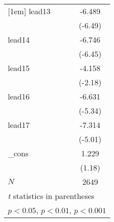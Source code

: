 {\begin{tabular}{l*{1}{c}}
[1em]
lead13      &      -6.489\sym{***}\\
            &     (-6.49)         \\
[1em]
lead14      &      -6.746\sym{***}\\
            &     (-6.45)         \\
[1em]
lead15      &      -4.158\sym{*}  \\
            &     (-2.18)         \\
[1em]
lead16      &      -6.631\sym{***}\\
            &     (-5.34)         \\
[1em]
lead17      &      -7.314\sym{***}\\
            &     (-5.01)         \\
[1em]
\_cons      &       1.229         \\
            &      (1.18)         \\
\hline
\(N\)       &        2649         \\
\hline\hline
\multicolumn{2}{l}{\footnotesize \textit{t} statistics in parentheses}\\
\multicolumn{2}{l}{\footnotesize \sym{*} \(p<0.05\), \sym{**} \(p<0.01\), \sym{***} \(p<0.001\)}\\
\end{tabular}
}
